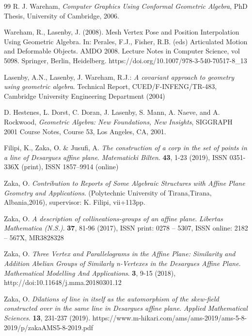 \documentclass{amsart}
\theoremstyle{plain}
\numberwithin{equation}{section}
\begin{document}
\begin{thebibliography}{99}
R. J. Wareham,
\textit{Computer Graphics Using Conformal Geometric Algebra},
PhD Thesis, University of Cambridge, 2006.

Wareham, R., Lasenby, J. (2008). Mesh Vertex Pose and Position Interpolation Using Geometric Algebra. In: Perales, F.J., Fisher, R.B. (eds) Articulated Motion and Deformable Objects. AMDO 2008. Lecture Notes in Computer Science, vol 5098. Springer, Berlin, Heidelberg. https://doi.org/10.1007/978-3-540-70517-8\_13

Lasenby, A.N., Lasenby, J. Wareham, R.J.: \textit{A covariant approach to geometry using geometric algebra}. Technical Report, CUED/F-INFENG/TR-483, Cambridge University Engineering Department (2004)


D. Hestenes, L. Dorst, C. Doran, J. Lasenby, S. Mann, A. Naeve, and A. Rockwood, \textit{Geometric Algebra: New Foundations, New Insights}, SIGGRAPH 2001 Course Notes, Course 53, Los Angeles, CA, 2001.




 Filipi, K., Zaka, O. \& Jusufi, A. {\it The construction of a corp in the set of points in a line of Desargues affine plane}. {\em Matematicki Bilten}. \textbf{43}, 1-23 (2019), ISSN 0351-336X (print), ISSN 1857–9914 (online)

 Zaka, O. {\it Contribution to Reports of Some Algebraic Structures with Affine Plane Geometry and Applications}. (Polytechnic University of Tirana,Tirana, Albania,2016), supervisor: K. Filipi, vii+113pp.

 Zaka, O. {\it A description of collineations-groups of an affine plane}. {\em Libertas Mathematica (N.S.)}. \textbf{37}, 81-96 (2017), ISSN print: 0278 – 5307, ISSN online: 2182 – 567X, MR3828328

 Zaka, O. {\it Three Vertex and Parallelograms in the Affine Plane: Similarity and Addition Abelian Groups of Similarly n-Vertexes in the Desargues Affine Plane}. {\em Mathematical Modelling And Applications}. \textbf{3}, 9-15 (2018), http://doi:10.11648/j.mma.20180301.12

 Zaka, O. {\it Dilations of line in itself as the automorphism of the skew-field constructed over in the same line in Desargues affine plane}. {\em Applied Mathematical Sciences}. \textbf{13}, 231-237 (2019). https://www.m-hikari.com/ams/ams-2019/ams-5-8-2019/p/zakaAMS5-8-2019.pdf


\end{thebibliography}
\end{document}
